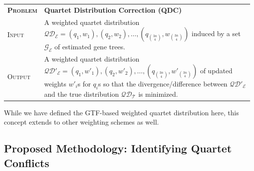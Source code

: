 \documentclass[10pt,a4paper]{article}
\begin{document}
\vspace{0.3cm}
\begin{tabular}{p{1.8cm}p{12cm}}
\textbf{\textsc{Problem}} &\textbf{Quartet Distribution Correction (QDC)}\\
\textsc{Input} & A weighted quartet distribution $\mathcal{QD_E} = (q_1,w_1), (q_2,w_2), \ldots, (q_{3n \choose 4},w_{3n \choose 4})$ induced by a set $\mathcal{G_E}$ of estimated gene trees. \\
\textsc{Output} & A weighted quartet distribution $\mathcal{QD'_E} = (q_1,w'_1), (q_2,w'_2), \ldots, (q_{3n \choose 4}, w'_{3n \choose 4})$ of updated weights $w'_i$s for $q_i$s so that the divergence/difference between $\mathcal{QD'_E}$ and the true distribution $\mathcal{QD_T}$ is minimized. %
\end{tabular}

While we have defined the GTF-based weighted quartet distribution here, this concept extends to other weighting schemes as well. %

\subsection{Proposed Methodology: Identifying Quartet Conflicts}
\label{sec:qt-conflict}
\end{document}
